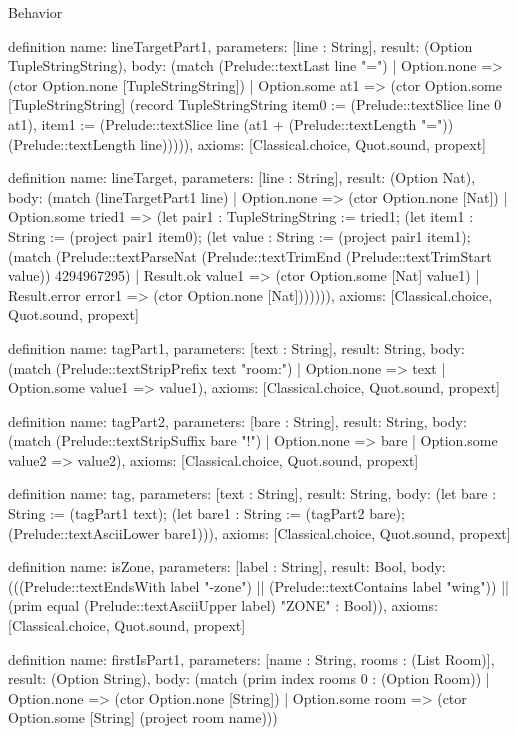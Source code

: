 \begin{lexlean}{Behavior}
\begin{semanticmodule}
definition{
  name: lineTargetPart1,
  parameters: [line : String],
  result: (Option TupleStringString),
  body: (match (Prelude::textLast line "=")
    | Option.none => (ctor Option.none [TupleStringString])
    | Option.some at1 => (ctor Option.some [TupleStringString] (record TupleStringString {item0 := (Prelude::textSlice line 0 at1), item1 := (Prelude::textSlice line (at1 + (Prelude::textLength "=")) (Prelude::textLength line))}))),
  axioms: [Classical.choice, Quot.sound, propext]
}

definition{
  name: lineTarget,
  parameters: [line : String],
  result: (Option Nat),
  body: (match (lineTargetPart1 line)
    | Option.none => (ctor Option.none [Nat])
    | Option.some tried1 => (let pair1 : TupleStringString := tried1; (let item1 : String := (project pair1 item0); (let value : String := (project pair1 item1); (match (Prelude::textParseNat (Prelude::textTrimEnd (Prelude::textTrimStart value)) 4294967295)
      | Result.ok value1 => (ctor Option.some [Nat] value1)
      | Result.error error1 => (ctor Option.none [Nat])))))),
  axioms: [Classical.choice, Quot.sound, propext]
}

definition{
  name: tagPart1,
  parameters: [text : String],
  result: String,
  body: (match (Prelude::textStripPrefix text "room:")
    | Option.none => text
    | Option.some value1 => value1),
  axioms: [Classical.choice, Quot.sound, propext]
}

definition{
  name: tagPart2,
  parameters: [bare : String],
  result: String,
  body: (match (Prelude::textStripSuffix bare "!")
    | Option.none => bare
    | Option.some value2 => value2),
  axioms: [Classical.choice, Quot.sound, propext]
}

definition{
  name: tag,
  parameters: [text : String],
  result: String,
  body: (let bare : String := (tagPart1 text); (let bare1 : String := (tagPart2 bare); (Prelude::textAsciiLower bare1))),
  axioms: [Classical.choice, Quot.sound, propext]
}

definition{
  name: isZone,
  parameters: [label : String],
  result: Bool,
  body: (((Prelude::textEndsWith label "-zone") || (Prelude::textContains label "wing")) || (prim equal (Prelude::textAsciiUpper label) "ZONE" : Bool)),
  axioms: [Classical.choice, Quot.sound, propext]
}

definition{
  name: firstIsPart1,
  parameters: [name : String, rooms : (List Room)],
  result: (Option String),
  body: (match (prim index rooms 0 : (Option Room))
    | Option.none => (ctor Option.none [String])
    | Option.some room => (ctor Option.some [String] (project room name)))
}


\end{semanticmodule}
\end{lexlean}
